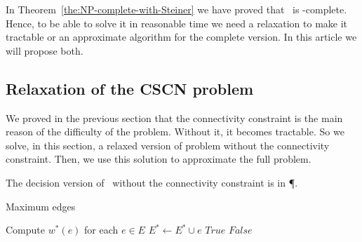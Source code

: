 

In Theorem~\ref{the:NP-complete-with-Steiner} we have proved that \PROBLEM~is \NP-complete. Hence, to be able to solve it in reasonable time we need a relaxation to make it tractable or an approximate algorithm for the complete version. In this article we will propose both.

\subsection{Relaxation of the CSCN problem}\label{algorithm_section}
We proved in the previous section that the connectivity constraint is the main reason of the difficulty of the problem. Without it, it becomes tractable. So we solve, in this section, a relaxed version of problem without the connectivity constraint. Then, we use this solution to approximate the full problem.

\begin{theorem} The decision version of \PROBLEM~without the connectivity constraint is in \P.
\end{theorem}


\begin{algorithm}
\caption{Maximum edges}
\label{alg_max_edges}
\begin{algorithmic}
\State Compute $w^*(e)$ for each $e \in E$
\State {} 
	\State $E^* \gets E^* \cup {e}$ 
		\State \Return $True$
    \EndIf
\EndFor
\State \Return $False$
\end{algorithmic}
\end{algorithm}

